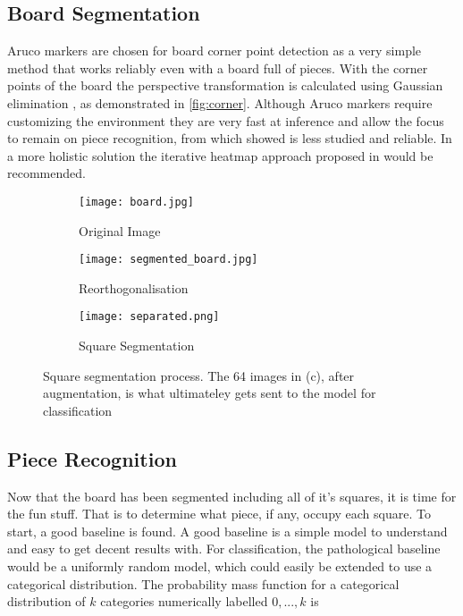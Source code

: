 \subsection{Board Segmentation}
Aruco markers are chosen for board corner point detection as a very simple method that works reliably even with a board full of pieces.
With the corner points of the board the perspective transformation is calculated using
Gaussian elimination \cite{gauss}, as demonstrated in \autoref{fig:corner}.
Although Aruco markers require customizing the environment they are very fast at 
inference and allow the focus to remain on piece recognition, from which
 showed is less studied and reliable.  In a more holistic solution the 
iterative heatmap approach proposed in \cite{heatmap} would be recommended.

\begin{figure}[h]
    \centering
    \begin{subfigure}[b]{0.32\textwidth}
        \centering
        \texttt{[image: board.jpg]}
        \caption{Original Image}
    \end{subfigure}
    \hfill
    \begin{subfigure}[b]{0.32\textwidth}
        \centering
        \texttt{[image: segmented\_board.jpg]}
        \caption{Reorthogonalisation}
    \end{subfigure}
    \hfill
    \begin{subfigure}[b]{0.32\textwidth}
        \centering
        \texttt{[image: separated.png]}
        \caption{Square Segmentation}
    \end{subfigure}
\caption{Square segmentation process.  The 64 images in (c), after augmentation, is what ultimateley gets sent to the model for classification}
\label{fig:corner}
\end{figure}
    

\subsection{Piece Recognition}
Now that the board has been segmented including all of it's squares, it is time for the fun stuff.  That is
to determine what piece, if any, occupy each square.  To start, a good baseline is found.  
A good baseline is a simple model to understand and easy to get decent results with.
For classification, the pathological baseline would be a uniformly random model, which could easily be extended to use a categorical distribution.
The probability mass function for a categorical distribution of $k$ categories numerically labelled $0, ..., k$ is

